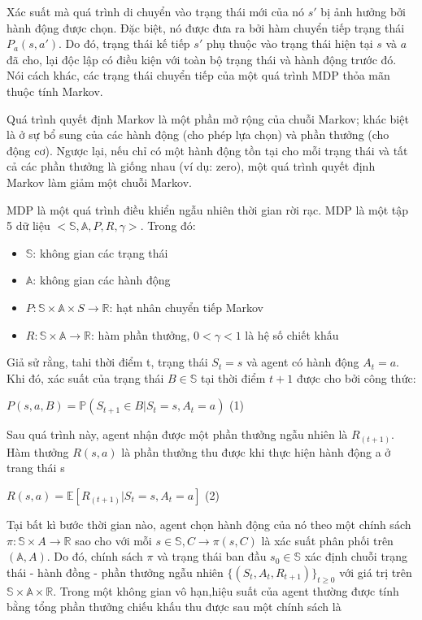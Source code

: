 \documentclass[14pt]{extreport}
\begin{document}
 Xác suất mà quá trình di chuyển vào trạng thái mới của nó $s'$ bị ảnh hưởng bởi hành động được chọn. Đặc biệt, nó được đưa ra bởi hàm chuyển tiếp trạng thái $P_a (s,a')$. Do đó, trạng thái kế tiếp $s'$ phụ thuộc vào trạng thái hiện tại $s$ và $a$ đã cho, lại độc lập có điều kiện với toàn bộ trạng thái và hành động trước đó. Nói cách khác, các trạng thái chuyển tiếp của một quá trình MDP thỏa mãn thuộc tính Markov.
 
 Quá trình quyết định Markov là một phần mở rộng của chuỗi Markov; khác biệt là ở sự bổ sung của các hành động (cho phép lựa chọn) và phần thưởng (cho động cơ). Ngược lại, nếu chỉ có một hành động tồn tại cho mỗi trạng thái và tất cả các phần thưởng là giống nhau (ví dụ: zero), một quá trình quyết định Markov làm giảm một chuỗi Markov.

MDP là một quá trình điều khiển ngẫu nhiên thời gian rời rạc. MDP là một tập 5 dữ liệu $<\mathbb{S},\mathbb{A},P,R,\gamma>$. Trong đó:

\begin{itemize}
 \item  $\mathbb{S}$: không gian các trạng thái
 \item $\mathbb{A}$: không gian các hành động
 \item  $P: \mathbb{S} \times\mathbb{A} \times S\rightarrow \mathbb{R}$: hạt nhân chuyển tiếp Markov
 \item $R: \mathbb{S} \times \mathbb{A}\rightarrow \mathbb{R}$: hàm phần thưởng, $0<\gamma<1$ là hệ số chiết khấu
\end{itemize}
 Giả sử rằng, tahi thời điểm t, trạng thái $S_t=s$ và agent có hành động $A_t=a$. Khi đó, xác suất của trạng thái $B \in \mathbb{S}$ tại thời điểm $t+1$ được cho bởi công thức:
 
 \begin{center}
 $P(s,a,B)=\mathbb{P} (S_{t+1} \in B|S_t=s,A_t=a)$       (1)
 \end{center}
 
 Sau quá trình này, agent nhận được một phần thưởng ngẫu nhiên là $R_(t+1)$. Hàm thưởng $R(s,a)$ là phần thưởng thu được khi thực hiện hành động a ở trang thái s
 
 \begin{center}
 $R(s,a)=\mathbb{E}[R_(t+1)|S_t=s,A_t=a]$         (2)
 \end{center}
 
 Tại bất kì bước thời gian nào, agent chọn hành động của nó theo một chính sách $\pi: \mathbb{S} \times A \rightarrow \mathbb{R}$ sao cho với mỗi $s \in \mathbb{S},C \rightarrow \pi(s,C)$ là  xác suất phân phối trên $(\mathbb{A},A)$. Do đó, chính sách $\pi$ và trạng thái ban đầu $s_0 \in \mathbb{S}$ xác định chuỗi trạng thái - hành đồng - phần thưởng ngẫu nhiên $\{(S_t,A_t,R_{t+1})\}_{t \geq 0}$ với giá trị trên $\mathbb{S} \times \mathbb{A} \times \mathbb{R}$. Trong một không gian vô hạn,hiệu suất của agent thường được tính bằng tổng phần thưởng chiếu khấu thu được sau một chính sách là
 
\end{document}
